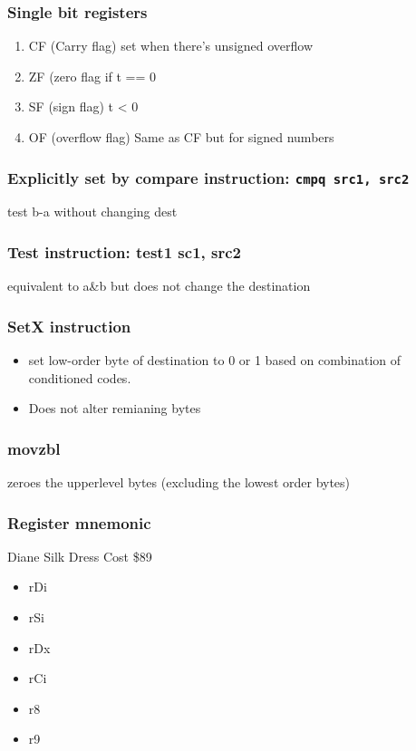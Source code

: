 \documentclass[11pt]{article}
\begin{document}
\subsubsection{Single bit registers}
\label{sec-7-2-1}
\begin{enumerate}
\item CF (Carry flag)
\label{sec-7-2-1-1}
set when there's unsigned overflow
\item ZF (zero flag
\label{sec-7-2-1-2}
if t == 0
\item SF (sign flag)
\label{sec-7-2-1-3}
t < 0
\item OF (overflow flag)
\label{sec-7-2-1-4}
Same as CF but for signed numbers
\end{enumerate}
\subsubsection{Explicitly set by compare instruction: \texttt{cmpq src1, src2}}
\label{sec-7-2-2}
test b-a without changing dest
\subsubsection{Test instruction: test1 sc1, src2}
\label{sec-7-2-3}
equivalent to a\&b but does not change the destination
\subsubsection{SetX instruction}
\label{sec-7-2-4}
\begin{itemize}
\item set low-order byte of destination to 0 or 1 based on combination of conditioned codes.
\item Does not alter remianing bytes
\end{itemize}
\subsubsection{movzbl}
\label{sec-7-2-5}
zeroes the upperlevel bytes (excluding the lowest order bytes)
\subsubsection{Register mnemonic}
\label{sec-7-2-6}
Diane Silk Dress Cost \$89
\begin{itemize}
\item rDi
\item rSi
\item rDx
\item rCi
\item r8
\item r9
\end{itemize}
\end{document}
